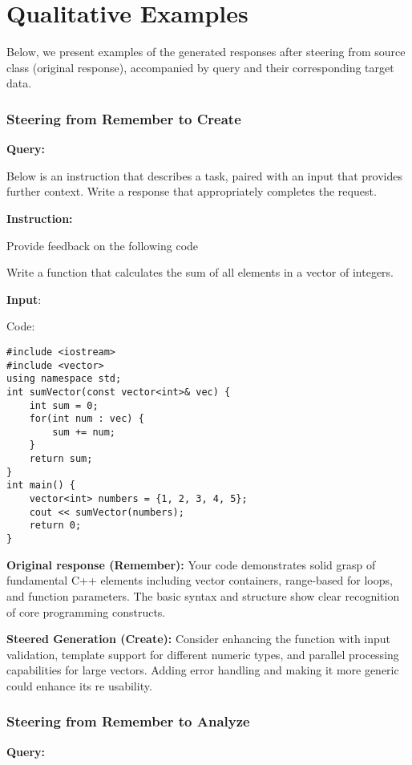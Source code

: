 \section{Qualitative Examples}

\label{sec:Qualitative}
Below, we present examples of the generated responses after steering from source class (original response), accompanied by query and their corresponding target data.







\medskip
\subsubsection*{Steering from Remember to Create}
\textbf{Query:}

Below is an instruction that describes a task, paired with an input that provides further context. Write a response that appropriately completes the request.\par
\textbf{Instruction:}\par
Provide feedback on the following code\par
Write a function that calculates the sum of all elements in a vector of integers.\par
\textbf{Input}:\par
Code:
\begin{lstlisting}
#include <iostream>
#include <vector>
using namespace std;
int sumVector(const vector<int>& vec) {
    int sum = 0;
    for(int num : vec) {
        sum += num;
    }
    return sum;
}
int main() {
    vector<int> numbers = {1, 2, 3, 4, 5};
    cout << sumVector(numbers);
    return 0;
}
\end{lstlisting}


\textbf{Original response (Remember):} Your code demonstrates solid grasp of fundamental C++ elements including vector containers, range-based for loops, and function parameters. The basic syntax and structure show clear recognition of core programming constructs.

\textbf{Steered Generation (Create):} Consider enhancing the function with input validation, template support for different numeric types, and parallel processing capabilities for large vectors. Adding error handling and making it more generic could enhance its re usability.



\medskip
\subsubsection*{Steering from Remember to Analyze}
\textbf{Query:}\par

